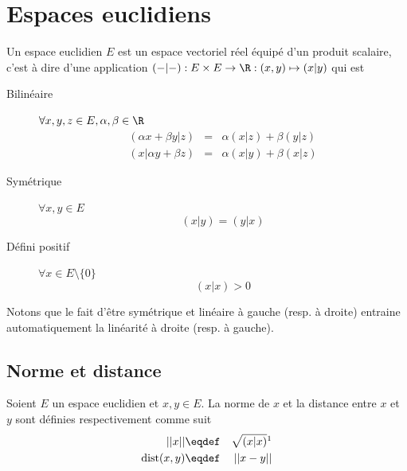 \section{Espaces euclidiens}
\begin{mydef}
	Un espace euclidien $E$ est un espace vectoriel réel équipé d'un produit scalaire, c'est à dire d'une application
	$(-|-) : E \times E \to \R : (x, y) \mapsto (x|y)$ qui est
	\begin{description}
			\item[Bilinéaire]
			$\forall x, y, z \in E, \alpha, \beta \in \R$
			\begin{eqnarray*}
				(\alpha x + \beta y | z) & = & \alpha (x | z) + \beta (y | z)\\
				(x | \alpha y + \beta z) & = & \alpha (x | y) + \beta (x | z)
			\end{eqnarray*}
			\item[Symétrique]
			$\forall x,y \in E$
			$$(x|y) = (y|x)$$
			\item[Défini positif]
			$\forall x \in E \setminus \{0\}$
			$$(x|x) > 0$$
	\end{description}
\end{mydef}

\begin{myrem}
	Notons que le fait d'être symétrique et linéaire à gauche (resp. à droite) entraine automatiquement la linéarité à droite (resp. à gauche).
\end{myrem}

\subsection{Norme et distance}

\begin{mydef}
	Soient $E$ un espace euclidien et $x,y \in E$.
	La norme de $x$ et la distance entre $x$ et $y$ sont définies respectivement comme suit
	\begin{eqnarray*}
		||x|| & \eqdef & \sqrt{(x|x)}\footnotemark\\
		\dist(x, y) & \eqdef & ||x - y||\\
	\end{eqnarray*}
\end{mydef}

